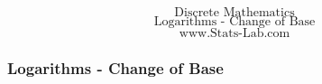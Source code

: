 \documentclass{beamer}
\begin{document}
\begin{frame}
{
\huge
\[ \mbox{Discrete Mathematics} \]
\[ \mbox{Logarithms - Change of Base} \]
}
{
\Large
\[ \mbox{www.Stats-Lab.com} \]
}
\end{frame}
\begin{frame}
\frametitle{Logarithms - Change of Base}

		
	\end{frame}
	\begin{frame}
	\end{frame}
\end{document}
